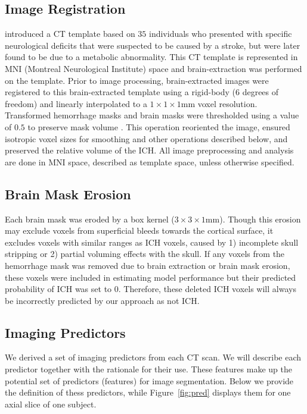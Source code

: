 \documentclass{elsarticle_nonatbib}\usepackage[]{graphicx}\usepackage[]{color}
\begin{document}
\subsection{Image Registration}
\citet{rorden_age-specific_2012} introduced a CT template based on $35$ individuals who presented with specific neurological deficits that were suspected to be caused by a stroke, but were later found to be due to a metabolic abnormality.  This CT template is represented in MNI (Montreal Neurological Institute) space and brain-extraction was performed on the template.  Prior to image processing, brain-extracted images were registered to this brain-extracted template using a rigid-body (6 degrees of freedom) and linearly interpolated to a $1\times1\times1$mm voxel resolution.  Transformed hemorrhage masks and brain masks were thresholded using a value of $0.5$ to preserve mask volume \cite{flirt_reg}. This operation reoriented the image, ensured isotropic voxel sizes for smoothing and other operations described below, and preserved the relative volume of the ICH.  All image preprocessing and analysis are done in MNI space, described as template space, unless otherwise specified.


\subsection{Brain Mask Erosion}
Each brain mask was eroded by a box kernel ($3\times3\times1$mm).  Though this erosion may exclude voxels from superficial bleeds towards the cortical surface, it excludes voxels with similar ranges as ICH voxels, caused by 1) incomplete skull stripping or 2) partial voluming effects with the skull.  If any voxels from the hemorrhage mask was removed due to brain extraction or brain mask erosion, these voxels were included in estimating model performance but their predicted probability of ICH was set to $0$.  Therefore, these deleted ICH voxels will always be incorrectly predicted by our approach as not ICH.  




\subsection{Imaging Predictors}
We derived a set of imaging predictors from each CT scan.  We will describe each predictor together with the rationale for their use.  These features make up the potential set of predictors (features) for image segmentation.  Below we provide the definition of thess predictors, while Figure~\ref{fig:pred} displays them for one axial slice of one subject. 
\end{document}
